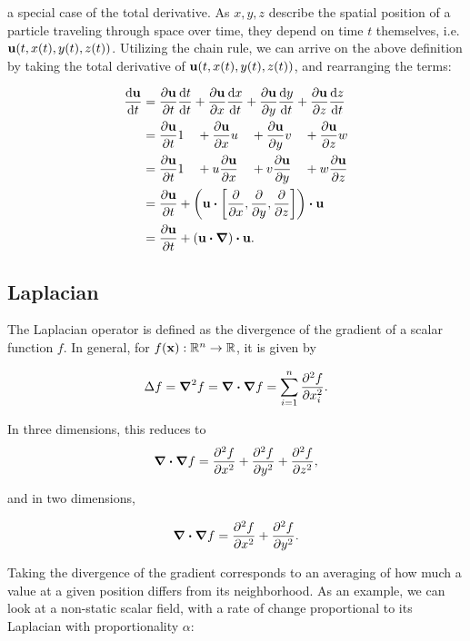 a special case of the total derivative. As $x, y, z$ describe the spatial
position of a particle traveling through space over time, they depend on time
$t$ themselves, i.e. $\vb{u}(t, x(t), y(t), z(t))$. Utilizing the chain rule,
we can arrive on the above definition by taking the total derivative of
$\vb{u}(t, x(t), y(t), z(t))$, and rearranging the terms:

\begin{alignat*}{2}\label{eq:material-derivative}
    \dv{\vb{u}}{t} &= \pdv{\vb{u}}{t}\dv{t}{t} 
                    + \pdv{\vb{u}}{x}\dv{x}{t} 
                    + \pdv{\vb{u}}{y}\dv{y}{t} 
                    + \pdv{\vb{u}}{z}\dv{z}{t} \\
                    &= \pdv{\vb{u}}{t} 1 \quad
                    + \pdv{\vb{u}}{x} u \quad
                    + \pdv{\vb{u}}{y} v \quad
                    + \pdv{\vb{u}}{z} w \\
                    &= \pdv{\vb{u}}{t} 1 \quad
                    + u \pdv{\vb{u}}{x} \quad
                    + v \pdv{\vb{u}}{y} \quad
                    + w \pdv{\vb{u}}{z} \\
                    &= \pdv{\vb{u}}{t} +
                    \qty(
                        \vb{u}
                        \vdot
                        \left[ \pdv{x}, \pdv{y}, \pdv{z} \right]
                    ) \vdot \vb{u} \\
                    &= \pdv{\vb{u}}{t}
                    + \qty(\vb{u}\vdot\grad)\vdot\vb{u}.
\end{alignat*}

\subsection*{Laplacian}
The Laplacian operator is defined as the divergence of the gradient of a scalar
function $f$. In general, for $f(\vb{x}): \mathbb{R}^n \to \mathbb{R}$, it is
given by

    $$\Delta f = \grad^2{f} = \grad \vdot \grad f = \sum_{i=1}^n
\pdv[2]{f}{x_i}.$$

In three dimensions, this reduces to 
$$\grad \vdot \grad f = \pdv[2]{f}{x} + \pdv[2]{f}{y} + \pdv[2]{f}{z},$$

and in two dimensions,

$$ \grad \vdot \grad f = \pdv[2]{f}{x} + \pdv[2]{f}{y}.$$

Taking the divergence of the gradient corresponds to an averaging of how much
a value at a given position differs from its neighborhood. As an example, we
can look at a non-static scalar field, with a rate of change proportional to
its Laplacian with proportionality $\alpha$:


